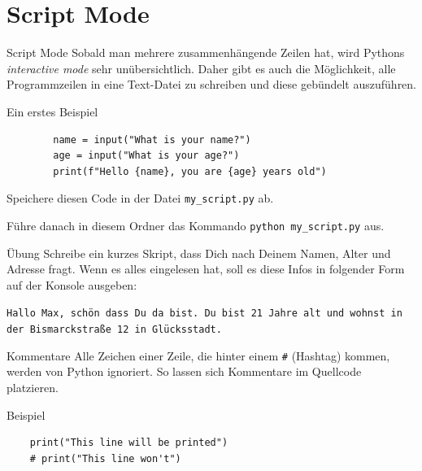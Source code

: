 \documentclass[algorithm,pgfplots,colortheme=dark]{cuzbeamer}
\newcommand{\py}[1]{\texttt{#1}}
\newcommand{\pybw}[1]{\texttt{#1}}
\begin{document}
\section{Script Mode}
\begin{frame}
\begin{block}{Script Mode}
	\vspace{2pt}
	Sobald man mehrere zusammenhängende Zeilen hat, wird Pythons \textit{interactive mode} sehr unübersichtlich. Daher gibt es auch die Möglichkeit, alle Programmzeilen in eine Text-Datei zu schreiben und diese gebündelt auszuführen.   
\end{block}

\end{frame}
\begin{fragile}[]
	\begin{exampleblock}{Ein erstes Beispiel}
		\begin{verbatim}
		name = input("What is your name?")
		age = input("What is your age?")
		print(f"Hello {name}, you are {age} years old") 
		\end{verbatim}
		
		Speichere diesen Code in der Datei \py{my_script.py} ab. 
		
		Führe danach in diesem Ordner das Kommando 
		\pybw{python my_script.py} aus. 
	\end{exampleblock}
\end{fragile}

\begin{frame}{Übung}
	Schreibe ein kurzes Skript, dass Dich nach Deinem Namen, Alter und Adresse fragt. Wenn es alles eingelesen hat, soll es diese Infos in folgender Form auf der Konsole ausgeben: 	
	
	\texttt{Hallo Max, schön dass Du da bist. Du bist 21 Jahre alt und wohnst in der Bismarckstraße 12 in Glücksstadt.}
	
\end{frame}


\begin{fragile}
	
	\begin{block}{Kommentare}
		\vspace{2pt}
		Alle Zeichen einer Zeile, die hinter einem \texttt{\#} (Hashtag) kommen, werden von Python ignoriert.
		So lassen sich Kommentare im Quellcode platzieren. 
	\end{block}
	\vspace{12pt}
	\begin{exampleblock}{Beispiel}
	\begin{verbatim}
	print("This line will be printed")
	# print("This line won't") 
	\end{verbatim}
	\end{exampleblock}
	
\end{fragile}
\end{document}
